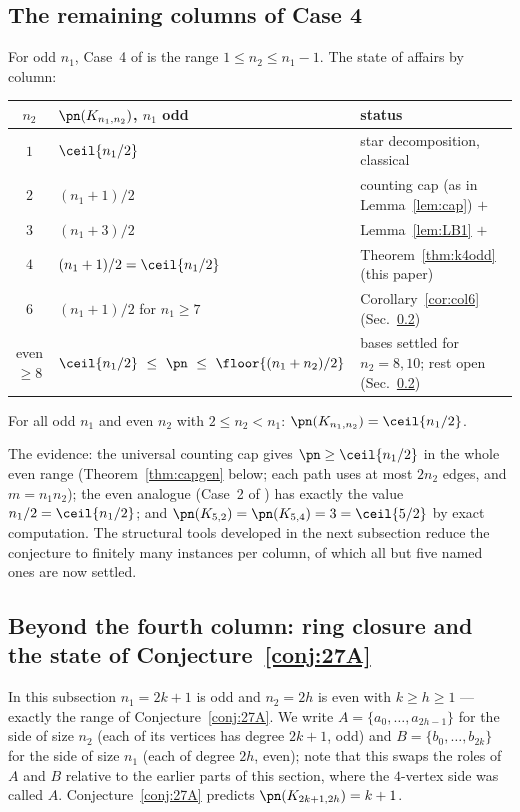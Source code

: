 \subsection{The remaining columns of Case 4}

For odd $n_1$, Case~4 of \cite{CE18} is the range $1\le n_2\le n_1-1$. The state of affairs by
column:
\begin{center}\small
\begin{tabular}{c l l}
\hline
$n_2$ & $\pn(K_{n_1,n_2})$, $n_1$ odd & status \\
\hline
$1$ & $\ceil{n_1/2}$ & star decomposition, classical\\
$2$ & $(n_1+1)/2$ & counting cap (as in Lemma~\ref{lem:cap}) $+$ \cite{Pyb96}\\
$3$ & $(n_1+3)/2$ & Lemma~\ref{lem:LB1} $+$ \cite{Pyb96}\\
$4$ & $(n_1+1)/2=\ceil{n_1/2}$ & Theorem~\ref{thm:k4odd} (this paper)\\
$6$ & $(n_1+1)/2$ for $n_1\ge7$ & Corollary~\ref{cor:col6} (Sec.~\ref{subsec:27a})\\
even $\ge8$ & $\ceil{n_1/2}\ \le\ \pn\ \le\ \floor{(n_1+n_2)/2}$ & bases settled for
$n_2=8,10$; rest open (Sec.~\ref{subsec:27a})\\
\hline
\end{tabular}
\end{center}

\begin{conjecture}\label{conj:27A}
For all odd $n_1$ and even $n_2$ with $2\le n_2<n_1$:
$\pn(K_{n_1,n_2})=\ceil{n_1/2}$.
\end{conjecture}

The evidence: the universal counting cap gives $\pn\ge\ceil{n_1/2}$ in the whole even range
(Theorem~\ref{thm:capgen} below; each path uses at most $2n_2$ edges, and $m=n_1n_2$); the even
analogue (Case~2 of \cite{CE18}) has exactly the value $n_1/2=\ceil{n_1/2}$; and
$\pn(K_{5,2})=\pn(K_{5,4})=3=\ceil{5/2}$ by exact computation. The structural tools developed in
the next subsection reduce the conjecture to finitely many instances per column, of which all
but five named ones are now settled.

\subsection{Beyond the fourth column: ring closure and the state of
Conjecture~\ref{conj:27A}}\label{subsec:27a}

In this subsection $n_1=2k+1$ is odd and $n_2=2h$ is even with $k\ge h\ge1$ --- exactly the
range of Conjecture~\ref{conj:27A}. We write $A=\{a_0,\dots,a_{2h-1}\}$ for the side of size
$n_2$ (each of its vertices has degree $2k+1$, odd) and $B=\{b_0,\dots,b_{2k}\}$ for the side
of size $n_1$ (each of degree $2h$, even); note that this swaps the roles of $A$ and $B$
relative to the earlier parts of this section, where the $4$-vertex side was called $A$.
Conjecture~\ref{conj:27A} predicts $\pn(K_{2k+1,2h})=k+1$.

